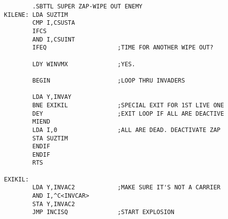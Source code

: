 \begin{lstlisting}
        .SBTTL SUPER ZAP-WIPE OUT ENEMY
KILENE: LDA SUZTIM
        CMP I,CSUSTA
        IFCS
        AND I,CSUINT
        IFEQ                    ;TIME FOR ANOTHER WIPE OUT?

        LDY WINVMX              ;YES.

        BEGIN                   ;LOOP THRU INVADERS

        LDA Y,INVAY
        BNE EXIKIL              ;SPECIAL EXIT FOR 1ST LIVE ONE
        DEY                     ;EXIT LOOP IF ALL ARE DEACTIVE
        MIEND
        LDA I,0                 ;ALL ARE DEAD. DEACTIVATE ZAP
        STA SUZTIM
        ENDIF
        ENDIF
        RTS

EXIKIL:
        LDA Y,INVAC2            ;MAKE SURE IT'S NOT A CARRIER
        AND I,^C<INVCAR>
        STA Y,INVAC2
        JMP INCISQ              ;START EXPLOSION
\end{lstlisting}
